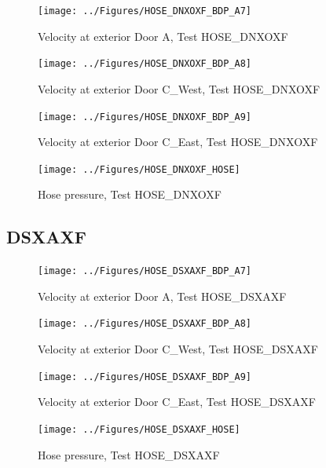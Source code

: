 \documentclass[11pt,oneside]{book}
\begin{document}
\begin{figure}[!ht]
\texttt{[image: ../Figures/HOSE\_DNXOXF\_BDP\_A7]}
\caption{Velocity at exterior Door A, Test HOSE\_DNXOXF}
\label{fig:HOSE_DNXOXF_BDP_A7}
\end{figure}

\begin{figure}[!ht]
\texttt{[image: ../Figures/HOSE\_DNXOXF\_BDP\_A8]}
\caption{Velocity at exterior Door C\_West, Test HOSE\_DNXOXF}
\label{fig:HOSE_DNXOXF_BDP_A8}
\end{figure}

\begin{figure}[!ht]
\texttt{[image: ../Figures/HOSE\_DNXOXF\_BDP\_A9]}
\caption{Velocity at exterior Door C\_East, Test HOSE\_DNXOXF}
\label{fig:HOSE_DNXOXF_BDP_A9}
\end{figure}

\begin{figure}[!ht]
\texttt{[image: ../Figures/HOSE\_DNXOXF\_HOSE]}
\caption{Hose pressure, Test HOSE\_DNXOXF}
\label{fig:HOSE_DNXOXF_HOSE}
\end{figure}


\clearpage


\subsection{DSXAXF}

\begin{figure}[!ht]
\texttt{[image: ../Figures/HOSE\_DSXAXF\_BDP\_A7]}
\caption{Velocity at exterior Door A, Test HOSE\_DSXAXF}
\label{fig:HOSE_DSXAXF_BDP_A7}
\end{figure}

\begin{figure}[!ht]
\texttt{[image: ../Figures/HOSE\_DSXAXF\_BDP\_A8]}
\caption{Velocity at exterior Door C\_West, Test HOSE\_DSXAXF}
\label{fig:HOSE_DSXAXF_BDP_A8}
\end{figure}

\begin{figure}[!ht]
\texttt{[image: ../Figures/HOSE\_DSXAXF\_BDP\_A9]}
\caption{Velocity at exterior Door C\_East, Test HOSE\_DSXAXF}
\label{fig:HOSE_DSXAXF_BDP_A9}
\end{figure}

\begin{figure}[!ht]
\texttt{[image: ../Figures/HOSE\_DSXAXF\_HOSE]}
\caption{Hose pressure, Test HOSE\_DSXAXF}
\label{fig:HOSE_DSXAXF_HOSE}
\end{figure}
\end{document}
